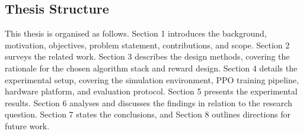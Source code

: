 \documentclass[../main.tex]{subfiles}
\begin{document}
\subsection{Thesis Structure}

This thesis is organised as follows. Section 1 introduces the background, motivation, objectives, problem statement, contributions, and scope. Section 2 surveys the related work. Section 3 describes the design methods, covering the rationale for the chosen algorithm stack and reward design. Section 4 details the experimental setup, covering the simulation environment, PPO training pipeline, hardware platform, and evaluation protocol. Section 5 presents the experimental results. Section 6 analyses and discusses the findings in relation to the research question. Section 7 states the conclusions, and Section 8 outlines directions for future work.
\end{document}
